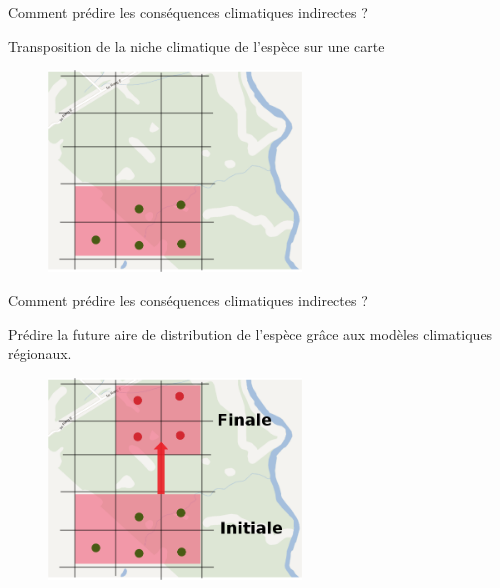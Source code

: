 \documentclass{eecslides}
\begin{document}
	\begin{frame}[t]{Comment prédire les conséquences climatiques indirectes ?}

		Transposition de la niche climatique de l'espèce sur une carte
		
		\begin{figure}
			\includegraphics[width=0.6\textwidth]{Map1.png} 
		\end{figure}    
	\end{frame}

	\begin{frame}[t]{Comment prédire les conséquences climatiques indirectes ?}

		Prédire la future aire de distribution de l'espèce grâce aux modèles climatiques régionaux.
		
		\begin{figure}
			\includegraphics[width=0.6\textwidth]{Map2m.png} 
		\end{figure}    
	\end{frame}
\end{document}
